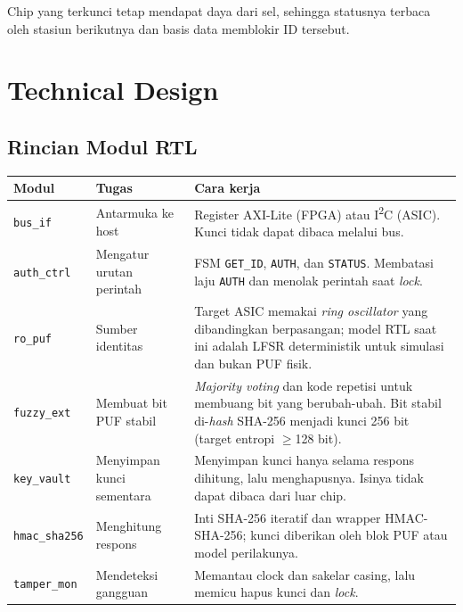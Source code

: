 \documentclass[11pt,a4paper]{article}
\newcommand{\hdr}[1]{\cellcolor{hdrgreen}\textbf{#1}}
\renewcommand{\arraystretch}{1.3}
\begin{document}
Chip yang terkunci tetap mendapat daya dari sel, sehingga statusnya terbaca oleh stasiun berikutnya dan basis data memblokir ID tersebut.

\section{Technical Design}

\subsection{Rincian Modul RTL}

\begin{center}
\footnotesize
\renewcommand{\arraystretch}{1.15}
\begin{tabularx}{\linewidth}{|>{\raggedright\arraybackslash}p{2.0cm}|>{\raggedright\arraybackslash}p{3.9cm}|X|}
\hline
\hdr{Modul} & \hdr{Tugas} & \hdr{Cara kerja} \\ \hline
\texttt{bus\_if} & Antarmuka ke host & Register AXI-Lite (FPGA) atau I\textsuperscript{2}C (ASIC). Kunci tidak dapat dibaca melalui bus. \\ \hline
\texttt{auth\_ctrl} & Mengatur urutan perintah & FSM \texttt{GET\_ID}, \texttt{AUTH}, dan \texttt{STATUS}. Membatasi laju \texttt{AUTH} dan menolak perintah saat \emph{lock}. \\ \hline
\texttt{ro\_puf} & Sumber identitas & Target ASIC memakai \emph{ring oscillator} yang dibandingkan berpasangan; model RTL saat ini adalah LFSR deterministik untuk simulasi dan bukan PUF fisik. \\ \hline
\texttt{fuzzy\_ext} & Membuat bit PUF stabil & \emph{Majority voting} dan kode repetisi untuk membuang bit yang berubah-ubah. Bit stabil di-\emph{hash} SHA-256 menjadi kunci 256 bit (target entropi $\geq$128 bit). \\ \hline
\texttt{key\_vault} & Menyimpan kunci sementara & Menyimpan kunci hanya selama respons dihitung, lalu menghapusnya. Isinya tidak dapat dibaca dari luar chip. \\ \hline
\texttt{hmac\_sha256} & Menghitung respons & Inti SHA-256 iteratif dan wrapper HMAC-SHA-256; kunci diberikan oleh blok PUF atau model perilakunya. \\ \hline
\texttt{tamper\_mon} & Mendeteksi gangguan & Memantau clock dan sakelar casing, lalu memicu hapus kunci dan \emph{lock}. \\ \hline
\end{tabularx}
\end{center}
\end{document}

